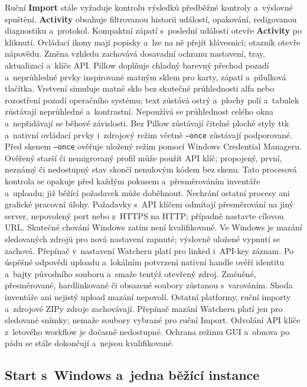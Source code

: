 \documentclass[11pt,a4paper]{article}
\newcommand{\ui}[1]{\textbf{#1}}
\begin{document}
Ruční \ui{Import} stále vyžaduje kontrolu výsledků předběžné kontroly a~výslovné
spuštění. \ui{Activity} obsahuje filtrovanou historii událostí, opakování,
redigovanou diagnostiku a~protokol. Kompaktní zápatí s~poslední událostí otevře
\ui{Activity} po kliknutí. Ovládací ikony mají popisky a~lze na ně přejít
klávesnicí; otazník otevře nápovědu. Změna vzhledu zachovává
dosavadní ochranu nastavení, tray, aktualizací a~klíče API.
Pillow doplňuje chladný barevný přechod pozadí a~neprůhledné prvky inspirované
matným sklem pro karty, zápatí a~pilulková tlačítka. Vrstvení simuluje matné
sklo
bez skutečné průhlednosti alfa nebo rozostření pozadí operačního systému; text
zůstává ostrý a~plochy polí a~tabulek zůstávají neprůhledné a~kontrastní.
Nepoužívá se
průhlednost celého okna a~nepřidávají se běhové závislosti. Bez Pillow zůstávají
čitelné ploché styly ttk a~nativní ovládací prvky i~zdrojový režim včetně
\texttt{--once} zůstávají podporované.
Před skenem \texttt{--once} ověřuje uložený režim pomocí Windows Credential
Manageru. Ověřený starší či nemigrovaný profil může použít API klíč; propojený,
první, neznámý či nedostupný stav skončí nenulovým kódem bez skenu. Tato
procesová kontrola se opakuje před každým pokusem a~přesměrováním inventáře
a~uploadu; již běžící požadavek může doběhnout. Nechrání ostatní procesy ani
grafické pracovní úlohy. Požadavky s~API klíčem odmítají přesměrování na jiný
server, nepovolený port nebo z~HTTPS na HTTP; případně nastavte cílovou URL.
Skutečné chování Windows zatím není kvalifikované.
Ve Windows je mazání sledovaných zdrojů pro nová nastavení zapnuté; výslovně
uložené vypnutí se zachová. Přepínač v~nastavení Watcheru platí pro linked
i~API-key záznam. Po úspěšné odpovědi uploadu a~lokálním potvrzení nativní
handle ověří identitu a~bajty původního souboru a~smaže tentýž otevřený zdroj.
Změněné, přesměrované, hardlinkované či obsazené soubory zůstanou s~varováním.
Shoda inventáře ani nejistý upload mazání nepovolí. Ostatní platformy, ruční
importy a~zdrojové ZIPy zdroje zachovávají. Přepínač mazání Watcheru platí
jen pro sledované snímky; nemaže soubory vybrané pro ruční Import. Odvolání
API klíče
z~letového workflow je dočasně nedostupné. Ochrana režimu GUI a~obnova po pádu
se stále dokončují a~nejsou kvalifikované.

\subsection{Start s~Windows a~jedna běžící instance}
\end{document}
